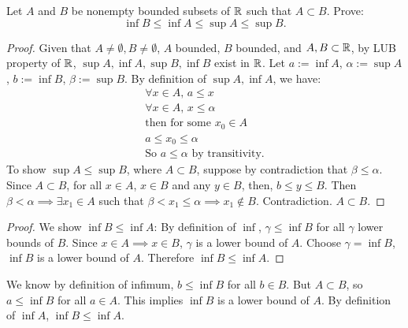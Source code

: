 \documentclass[]{article}
\begin{document}
\begin{example}
	[HW2.1] Let $A$ and $B$ be nonempty bounded subsets of $\mathbb{R}$ such that $A\subset B$. Prove: $$\inf B \leq \inf A \leq \sup A \leq \sup B.$$
	\begin{proof}
		Given that $A\neq \emptyset,B\neq\emptyset$, $A$ bounded, $B$ bounded, and $A,B\subset \mathbb{R}$, by LUB property of $\mathbb{R}$, $\sup A,\inf A, \sup B, \inf B$ exist in $\mathbb{R}$.
		Let $a:= \inf A$, $\alpha := \sup A$, $b:=\inf B$, $\beta:=\sup B$.
		By definition of $\sup A,\inf A$, we have:
		\begin{align*}
			\forall x\in A,\, a\leq x \\
			\forall x\in A,\, x\leq \alpha \\
			\text{then for some } x_0\in A \\
			a\leq x_0 \leq \alpha \\
			\text{So } a\leq \alpha \text{ by transitivity}.
		\end{align*}
		To show $\sup A\leq \sup B$, where $A\subset B$, suppose by contradiction that $\beta \leq \alpha$. Since $A\subset B$, for all $x\in A$, $x\in B$ and any $y\in B$, then, $b\leq y \leq B$.
		Then $\beta < \alpha \implies \exists x_1\in A$ such that $\beta<x_1\leq \alpha \implies x_1\notin B$. Contradiction. $A\subset B$.
	\end{proof}
	\begin{proof}
		We show $\inf B\leq \inf A$: By definition of $\inf$, $\gamma \leq \inf B$ for all $\gamma$ lower bounds of $B$.
		Since $x\in A \implies x\in B$, $\gamma$ is a lower bound of $A$. Choose $\gamma = \inf B$, $\inf B$ is a lower bound of $A$. Therefore $\inf B\leq \inf A$.
	\end{proof}
	We know by definition of infimum, $b\leq \inf B$ for all $b\in B$. But $A\subset B$, so $a\leq\inf B$ for all $a\in A$. 
	This implies $\inf B$ is a lower bound of $A$. By definition of $\inf A$, $\inf B\leq \inf A$.
\end{example}
\end{document}
